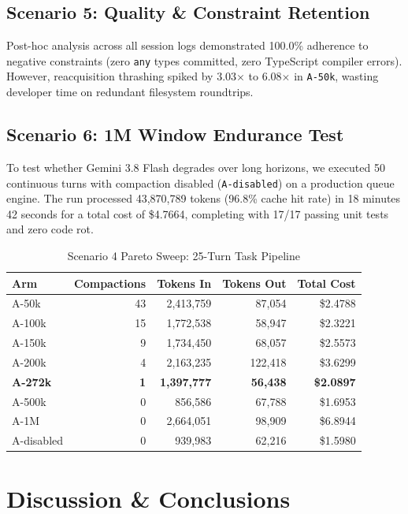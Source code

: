 \documentclass[10pt,twocolumn,a4paper]{article}
\begin{document}
\subsection{Scenario 5: Quality \& Constraint Retention}
Post-hoc analysis across all session logs demonstrated 100.0\% adherence to negative constraints (zero \texttt{any} types committed, zero TypeScript compiler errors). However, reacquisition thrashing spiked by 3.03$\times$ to 6.08$\times$ in \texttt{A-50k}, wasting developer time on redundant filesystem roundtrips.

\subsection{Scenario 6: 1M Window Endurance Test}
To test whether Gemini 3.8 Flash degrades over long horizons, we executed 50 continuous turns with compaction disabled (\texttt{A-disabled}) on a production queue engine. The run processed 43,870,789 tokens (96.8\% cache hit rate) in 18 minutes 42 seconds for a total cost of \$4.7664, completing with 17/17 passing unit tests and zero code rot.

\begin{table}[t]
\caption{Scenario 4 Pareto Sweep: 25-Turn Task Pipeline}
\label{tab:scenario4}
\centering
\small
\begin{tabular*}{\linewidth}{@{\extracolsep{\fill}}lrrrr@{}}
\toprule
\textbf{Arm} & \textbf{Compactions} & \textbf{Tokens In} & \textbf{Tokens Out} & \textbf{Total Cost} \\
\midrule
A-50k & 43 & 2,413,759 & 87,054 & \$2.4788 \\
A-100k & 15 & 1,772,538 & 58,947 & \$2.3221 \\
A-150k & 9 & 1,734,450 & 68,057 & \$2.5573 \\
A-200k & 4 & 2,163,235 & 122,418 & \$3.6299 \\
\textbf{A-272k} & \textbf{1} & \textbf{1,397,777} & \textbf{56,438} & \textbf{\$2.0897} \\
A-500k & 0 & 856,586 & 67,788 & \$1.6953 \\
A-1M & 0 & 2,664,051 & 98,909 & \$6.8944 \\
A-disabled & 0 & 939,983 & 62,216 & \$1.5980 \\
\bottomrule
\end{tabular*}
\end{table}

\section{Discussion \& Conclusions}
\end{document}
